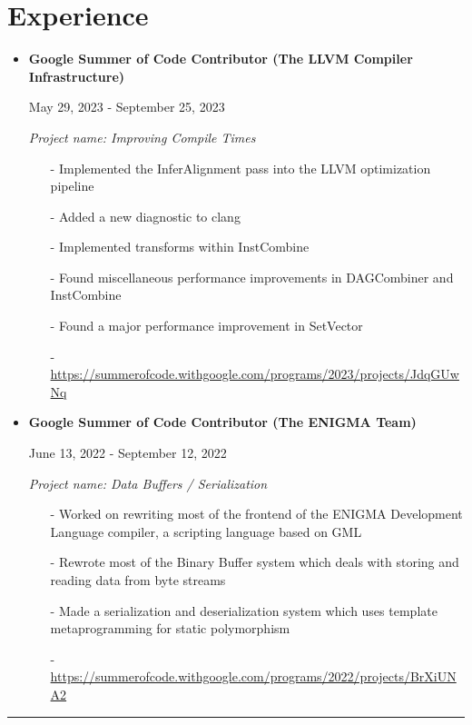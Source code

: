 \documentclass[12pt]{article}
\newcommand{\primarycolor}{red}
\newcommand{\mysection}[1]{\section{#1}\vspace{-1.2ex}}
\newcommand{\myhrule}[1]{
\vspace{1ex}
\hrule
\vspace{#1}
}
\begin{document}
    \mysection{Experience}
    {
        \begin{itemize}
            \item
                \textbf{Google Summer of Code Contributor (The LLVM Compiler Infrastructure)}

                {\color{\primarycolor}May 29, 2023 - September 25, 2023}

                \textit{Project name: Improving Compile Times}
                \vspace{-1ex}
                \begin{itemize}[itemsep=1ex, leftmargin=3.5ex]
                    \item[-] Implemented the InferAlignment pass into the LLVM optimization pipeline
                    \item[-] Added a new diagnostic to clang
                    \item[-] Implemented transforms within InstCombine
                    \item[-] Found miscellaneous performance improvements in DAGCombiner and InstCombine
                    \item[-] Found a major performance improvement in SetVector
                    \item[-] \url{https://summerofcode.withgoogle.com/programs/2023/projects/JdqGUwNq}
                \end{itemize}
            \item
                \textbf{Google Summer of Code Contributor (The ENIGMA Team)}

                {\color{\primarycolor}June 13, 2022 - September 12, 2022}

                \textit{Project name: Data Buffers / Serialization}
                \vspace{-1ex}
                \begin{itemize}[itemsep=1ex, leftmargin=3.5ex]
                    \item[-] Worked on rewriting most of the frontend of the ENIGMA Development Language compiler, a scripting language based on GML
                    \item[-] Rewrote most of the Binary Buffer system which deals with storing and reading data from byte streams
                    \item[-] Made a serialization and deserialization system which uses template metaprogramming for static polymorphism
                    \item[-] \url{https://summerofcode.withgoogle.com/programs/2022/projects/BrXiUNA2}
                \end{itemize}
        \end{itemize}
    }
    \myhrule{2ex}
\end{document}
